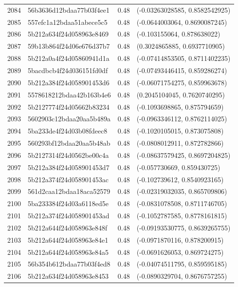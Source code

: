 \begin{table}[ht]
\begin{tabular}{rlrl}
  2084 & 56b3636d12bdaa77b03f4ee1 & 0.48 & (-0.03263028585, 0.8582542925) \\ 
  2085 & 557efc1a12bdaa51abece5c5 & 0.48 & (-0.0644003064, 0.8690087245) \\ 
  2086 & 5b212a634f24d058963e8469 & 0.48 & (-0.103155064, 0.878638022) \\ 
  2087 & 59b13b864f24d06e676d37b7 & 0.48 & (0.3024865885, 0.6937710905) \\ 
  2088 & 5b212a0a4f24d05860941d1a & 0.48 & (-0.07414853505, 0.8711402235) \\ 
  2089 & 5bacdbcb4f24d036151fd0df & 0.48 & (-0.07493446415, 0.859286274) \\ 
  2090 & 5b212a384f24d058901453d6 & 0.48 & (-0.06071754275, 0.859963678) \\ 
  2091 & 5578618212bdaa42b163b4e6 & 0.48 & (0.2045104045, 0.7620740295) \\ 
  2092 & 5b2127774f24d05662b83234 & 0.48 & (-0.1093698865, 0.875794659) \\ 
  2093 & 5602903c12bdaa20aa5b489a & 0.48 & (-0.0963346112, 0.8762114025) \\ 
  2094 & 5ba233de4f24d03b08fdeec8 & 0.48 & (-0.1020105015, 0.873075808) \\ 
  2095 & 560293bf12bdaa20aa5b48ab & 0.48 & (-0.0808012911, 0.872782866) \\ 
  2096 & 5b2127314f24d0562be00c4a & 0.48 & (-0.08637579425, 0.8697204825) \\ 
  2097 & 5b212a384f24d058901453d7 & 0.48 & (-0.057730669, 0.859430725) \\ 
  2098 & 5b212a374f24d058901453ac & 0.48 & (-0.102739612, 0.8540923165) \\ 
  2099 & 561d2caa12bdaa18aca52579 & 0.48 & (-0.02319032035, 0.865709806) \\ 
  2100 & 5ba233384f24d03a6118ed5e & 0.48 & (-0.0831078508, 0.8711746705) \\ 
  2101 & 5b212a374f24d058901453ad & 0.48 & (-0.1052787585, 0.8778161815) \\ 
  2102 & 5b212a644f24d058963e848f & 0.48 & (-0.09193530775, 0.8639265755) \\ 
  2103 & 5b212a644f24d058963e84e1 & 0.48 & (-0.0971870116, 0.878200915) \\ 
  2104 & 5b212a644f24d058963e84a5 & 0.48 & (-0.0691626053, 0.869724275) \\ 
  2105 & 56b354b612bdaa77b03f4ed8 & 0.48 & (-0.04074511795, 0.859595185) \\ 
  2106 & 5b212a634f24d058963e8453 & 0.48 & (-0.0890329704, 0.8676757255) \\ 

\end{tabular}
\end{table}
